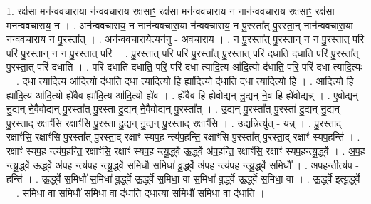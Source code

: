 \documentclass[17pt]{extarticle}
\begin{document}
1. रक्ष॑सा॒ मन॑न्ववचारा॒या न॑न्ववचाराय॒ रक्ष॑साꣳ॒॒ रक्ष॑सा॒ मन॑न्ववचाराय॒ न नान॑न्ववचाराय॒ रक्ष॑साꣳ॒॒ रक्ष॑सा॒ मन॑न्ववचाराय॒ न । . अन॑न्ववचाराय॒ न नान॑न्ववचारा॒या न॑न्ववचाराय॒ न पु॒रस्ता᳚त् पु॒रस्ता॒न् नान॑न्ववचारा॒या न॑न्ववचाराय॒ न पु॒रस्ता᳚त् । . अन॑न्ववचारा॒येत्यन॑नु - अ॒व॒चा॒रा॒य॒ । . न पु॒रस्ता᳚त् पु॒रस्ता॒न् न न पु॒रस्ता॒त् परि॒ परि॑ पु॒रस्ता॒न् न न पु॒रस्ता॒त् परि॑ । . पु॒रस्ता॒त् परि॒ परि॑ पु॒रस्ता᳚त् पु॒रस्ता॒त् परि॑ दधाति दधाति॒ परि॑ पु॒रस्ता᳚त् पु॒रस्ता॒त् परि॑ दधाति । . परि॑ दधाति दधाति॒ परि॒ परि॑ दधा त्यादि॒त्य आ॑दि॒त्यो द॑धाति॒ परि॒ परि॑ दधा त्यादि॒त्यः । . द॒धा॒ त्या॒दि॒त्य आ॑दि॒त्यो द॑धाति दधा त्यादि॒त्यो हि ह्या॑दि॒त्यो द॑धाति दधा त्यादि॒त्यो हि । . आ॒दि॒त्यो हि ह्या॑दि॒त्य आ॑दि॒त्यो ह्ये॑वैव ह्या॑दि॒त्य आ॑दि॒त्यो ह्ये॑व । . ह्ये॑वैव हि ह्ये॑वोद्यन् नु॒द्यन् ने॒व हि ह्ये॑वोद्यन्न् । . ए॒वोद्यन् नु॒द्यन् ने॒वैवोद्यन् पु॒रस्ता᳚त् पु॒रस्ता॑ दु॒द्यन् ने॒वैवोद्यन् पु॒रस्ता᳚त् । . उ॒द्यन् पु॒रस्ता᳚त् पु॒रस्ता॑ दु॒द्यन् नु॒द्यन् पु॒रस्ता॒द् रक्षाꣳ॑सि॒ रक्षाꣳ॑सि पु॒रस्ता॑ दु॒द्यन् नु॒द्यन् पु॒रस्ता॒द् रक्षाꣳ॑सि । . उ॒द्यन्नित्यु॑त् - यन्न् । . पु॒रस्ता॒द् रक्षाꣳ॑सि॒ रक्षाꣳ॑सि पु॒रस्ता᳚त् पु॒रस्ता॒द् रक्षाꣳ॑ स्यप॒ह न्त्य॑प॒हन्ति॒ रक्षाꣳ॑सि पु॒रस्ता᳚त् पु॒रस्ता॒द् रक्षाꣳ॑ स्यप॒हन्ति॑ । . रक्षाꣳ॑ स्यप॒ह न्त्य॑प॒हन्ति॒ रक्षाꣳ॑सि॒ रक्षाꣳ॑ स्यप॒ह न्त्यू॒र्द्ध्वे ऊ॒र्द्ध्वे अ॑प॒हन्ति॒ रक्षाꣳ॑सि॒ रक्षाꣳ॑ स्यप॒हन्त्यू॒र्द्ध्वे । . अ॒प॒ह न्त्यू॒र्द्ध्वे ऊ॒र्द्ध्वे अ॑प॒ह न्त्य॑प॒ह न्त्यू॒र्द्ध्वे स॒मिधौ॑ स॒मिधा॑ वू॒र्द्ध्वे अ॑प॒ह न्त्य॑प॒ह न्त्यू॒र्द्ध्वे स॒मिधौ᳚ । . अ॒प॒हन्तीत्य॑प - हन्ति॑ । . ऊ॒र्द्ध्वे स॒मिधौ॑ स॒मिधा॑ वू॒र्द्ध्वे ऊ॒र्द्ध्वे स॒मिधा॒ वा स॒मिधा॑ वू॒र्द्ध्वे ऊ॒र्द्ध्वे स॒मिधा॒ वा । . ऊ॒र्द्ध्वे इत्यू॒र्द्ध्वे । . स॒मिधा॒ वा स॒मिधौ॑ स॒मिधा॒ वा द॑धाति दधा॒त्या स॒मिधौ॑ स॒मिधा॒ वा द॑धाति । \newline
\end{document}
